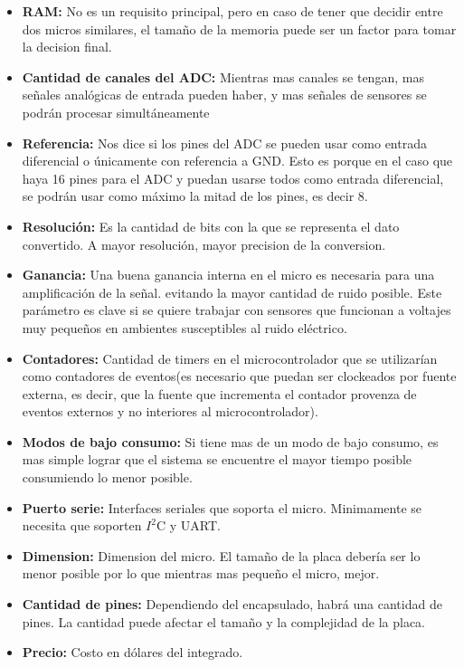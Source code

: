 \documentclass{article}
\theoremstyle{definition}
\theoremstyle{remark}
\begin{document}
\begin{itemize}
  \item \textbf{RAM:} No es un requisito principal, pero en caso de tener que decidir entre dos micros similares, el tamaño de la memoria puede ser un factor para tomar la decision final.
  \item \textbf{Cantidad de canales del ADC:} Mientras mas canales se tengan, mas señales analógicas de entrada pueden haber, y mas señales de sensores se podrán procesar simultáneamente
  \item \textbf{Referencia:} Nos dice si los pines del ADC se pueden usar como entrada diferencial o únicamente con referencia a GND. Esto es porque en el caso que haya 16 pines para el ADC y puedan usarse todos como entrada diferencial, se podrán usar como máximo la mitad de los pines, es decir 8.
  \item \textbf{Resolución:} Es la cantidad de bits con la que se representa el dato convertido. A mayor resolución, mayor precision de la conversion.
  \item \textbf{Ganancia:} Una buena ganancia interna en el micro es necesaria para una amplificación de la señal.  evitando la mayor cantidad de ruido posible. Este parámetro es clave si se quiere trabajar con sensores que funcionan a voltajes muy pequeños en ambientes susceptibles al ruido eléctrico.
  \item \textbf{Contadores:} Cantidad de timers en el microcontrolador que se utilizarían como contadores de eventos(es necesario que puedan ser clockeados por fuente externa, es decir, que la fuente que incrementa el contador provenza de eventos externos y no interiores al microcontrolador).
  \item \textbf{Modos de bajo consumo:} Si tiene mas de un modo de bajo consumo, es mas simple lograr que el sistema se encuentre el mayor tiempo posible consumiendo lo menor posible.
  \item \textbf{Puerto serie:} Interfaces seriales que soporta el micro. Minimamente se necesita que soporten $I^{2}$C y UART.
  \item \textbf{Dimension:} Dimension del micro. El tamaño de la placa debería ser lo menor posible por lo que mientras mas pequeño el micro, mejor.
  \item \textbf{Cantidad de pines:} Dependiendo del encapsulado, habrá una cantidad de pines. La cantidad puede afectar el tamaño y la complejidad de la placa.
  \item \textbf{Precio:} Costo en dólares del integrado.
\end{itemize}
\end{document}
